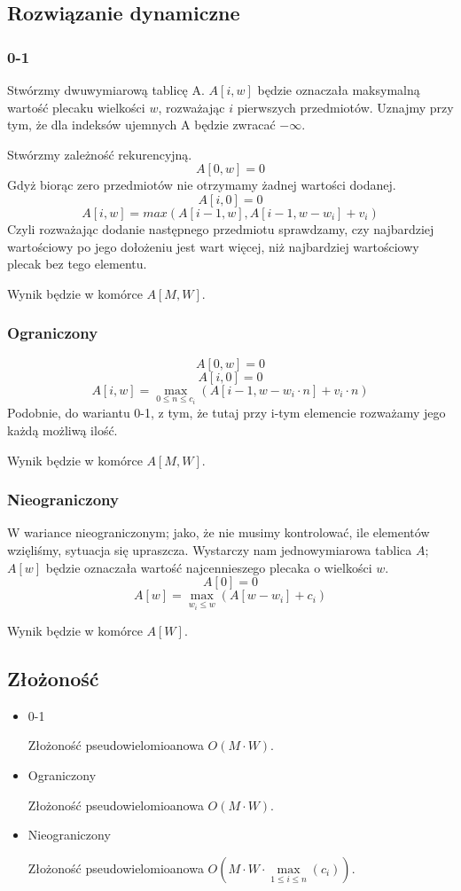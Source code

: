 \subsection{Rozwiązanie dynamiczne}
\subsubsection{0-1}
Stwórzmy dwuwymiarową tablicę A.
$A[i, w]$ będzie oznaczała maksymalną wartość plecaku wielkości $w$, rozważając $i$ pierwszych przedmiotów.
Uznajmy przy tym, że dla indeksów ujemnych A będzie zwracać $-\infty$.

Stwórzmy zależność rekurencyjną.
\[A[0, w] = 0\]
Gdyż biorąc zero przedmiotów nie otrzymamy żadnej wartości dodanej.
\[A[i, 0] = 0\]
\[A[i, w] = max(A[i - 1, w], A[i - 1, w - w_i] + v_i)\]
Czyli rozważając dodanie następnego przedmiotu sprawdzamy, czy najbardziej wartościowy po jego dołożeniu jest wart więcej, niż najbardziej wartościowy plecak bez tego elementu.

Wynik będzie w komórce $A[M, W]$.

\subsubsection{Ograniczony}
\[A[0, w] = 0\]
\[A[i, 0] = 0\]
\[A[i, w] = \max_{0 \leq n \leq c_i}(A[i - 1, w - w_i \cdot n] + v_i \cdot n)\]
Podobnie, do wariantu 0-1, z tym, że tutaj przy i-tym elemencie rozważamy jego każdą możliwą ilość.

Wynik będzie w komórce $A[M, W]$.

\subsubsection{Nieograniczony}
W wariance nieograniczonym; jako, że nie musimy kontrolować, ile elementów wzięliśmy, sytuacja się upraszcza.
Wystarczy nam jednowymiarowa tablica $A$; $A[w]$ będzie oznaczała wartość najcennieszego plecaka o wielkości $w$.
\[A[0] = 0\]
\[A[w] = \max_{w_i \le w}(A[w - w_i] + c_i) \]

Wynik będzie w komórce $A[W]$.

\subsection{Złożoność}
\begin{itemize}
  \item 0-1
  
  Złożoność pseudowielomioanowa $O(M \cdot W)$.
  \item Ograniczony
  
  Złożoność pseudowielomioanowa $O(M \cdot W)$.
  \item Nieograniczony
  
  Złożoność pseudowielomioanowa $O(M \cdot W \cdot \max\limits_{1 \le i \le n}(c_i))$.
\end{itemize}
